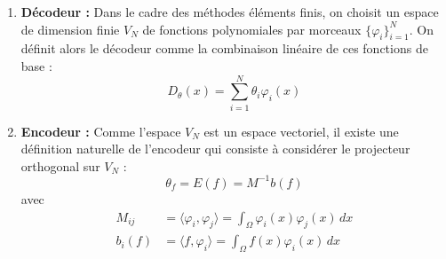 \documentclass[french]{article}
\begin{document}
	\begin{enumerate}[label=\textbullet]
		\item \textbf{Décodeur :} Dans le cadre des méthodes éléments finis, on choisit un espace de dimension finie $V_N$ de fonctions polynomiales par morceaux $\{\varphi_i\}_{i=1}^N$. On définit alors le décodeur comme la combinaison linéaire de ces fonctions de base :
		\begin{equation*}
			D_\theta(x) = \sum_{i=1}^N \theta_i \varphi_i(x)
		\end{equation*}
		\item \textbf{Encodeur :} Comme l'espace $V_N$ est un espace vectoriel, il existe une définition naturelle de l'encodeur qui consiste à considérer le projecteur orthogonal sur $V_N$ :
		\begin{equation*}
			\theta_f = E(f) = M^{-1} b(f)
		\end{equation*}
		avec 
		\begin{align*}
			M_{ij} &= \langle \varphi_i, \varphi_j\rangle = \int_{\Omega} \varphi_i(x) \varphi_j(x) \, dx \\
			b_i(f) &= \langle f, \varphi_i \rangle = \int_{\Omega} f(x) \varphi_i(x) \, dx
		\end{align*}
		

\end{enumerate}
\end{document}
